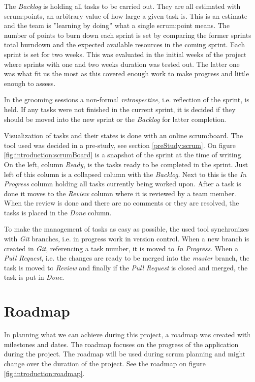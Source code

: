 The \textit{Backlog} is holding all tasks to be carried out.
They are all estimated with \glspl{scrum:point}, an arbitrary value of how large a given task is.
This is an estimate and the team is ''learning by doing'' what a single \gls{scrum:point} means.
The number of points to burn down each sprint is set by comparing the former sprints total burndown and the expected available resources in the coming sprint.
Each sprint is set for two weeks. 
This was evaluated in the initial weeks of the project where sprints with one and two weeks duration was tested out.
The latter one was what fit us the most as this covered enough work to make progress and little enough to assess.

In the grooming sessions a non-formal \textit{retrospective}, i.e. reflection of the sprint, is held. 
If any tasks were not finished in the current sprint, it is decided if they should be moved into the new sprint or the \textit{Backlog} for latter completion.

Visualization of tasks and their states is done with an online \gls{scrum:board}.
The tool used was decided in a pre-study, see section \ref{preStudy:scrum}.
On figure \ref{fig:introduction:scrumBoard} is a snapshot of the sprint at the time of writing.
On the left, column \textit{Ready}, is the tasks ready to be completed in the sprint.
Just left of this column is a collapsed column with the \textit{Backlog}.
Next to this is the \textit{In Progress} column holding all tasks currently being worked upon.
After a task is done it moves to the \textit{Review} column where it is reviewed by a team member.
When the review is done and there are no comments or they are resolved, the tasks is placed in the \textit{Done} column.

To make the management of tasks as easy as possible, the used tool synchronizes with \textit{Git} branches, i.e. in progress work in version control. 
When a new branch is created in \textit{Git}, referencing a task number, it is moved to \textit{In Progress}. 
When a \textit{Pull Request}, i.e. the changes are ready to be merged into the \textit{master} branch, the task is moved to \textit{Review} and finally if the \textit{Pull Request} is closed and merged, the task is put in \textit{Done}.


\section{Roadmap}
In planning what we can achieve during this project, a roadmap was created with milestones and dates. 
The roadmap focuses on the progress of the application during the project. 
The roadmap will be used during \gls{scrum} planning and might change over the duration of the project. 
See the roadmap on figure \ref{fig:introduction:roadmap}.

